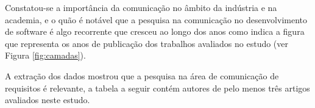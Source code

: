 \begin{figure}[h!] 
   	    \captionsetup{width=16cm}%
	\end{figure}



Constatou-se a importância da comunicação no âmbito da indústria e na academia, e o quão é notável que a pesquisa na comunicação no desenvolvimento de software é algo recorrente que cresceu ao longo dos anos como indica a figura que representa os anos de publicação dos trabalhos avaliados no estudo (ver Figura \ref{fig:camadas}).



\begin{figure}[h!] 
   	    \captionsetup{width=16cm}%
	\end{figure}


A extração dos dados mostrou que a pesquisa na área de comunicação de requisitos é relevante, a tabela a seguir contém autores de pelo menos três artigos avaliados neste estudo.

